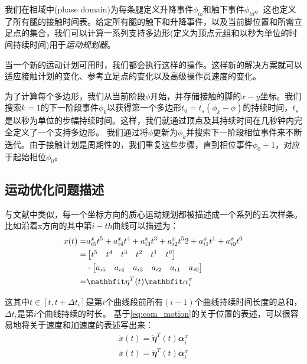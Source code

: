 我们在相域中(phase domain)为每条腿定义升降事件$\phi_{lo}$和触下事件$\phi_{td}$。这也定义了所有腿的接触时间表。给定所有腿的触下和升降事件，以及当前脚位置和所需立足点的集合，我们可以计算一系列支持多边形(定义为顶点元组和以秒为单位的时间持续时间)用于\emph{运动规划器}。

当一个新的运动计划可用时，我们都会执行这样的操作。这样新的解决方案就可以适应接触计划的变化、参考立足点的变化以及高级操作员速度的变化。

为了计算每个多边形，我们从当前阶段$\phi$开始，并存储接触的脚的$x-y$坐标。我们搜索$k=1$的下一阶段事件$\phi_k$以获得第一个多边形$t_0=  t_s(\phi_k-\phi)$的持续时间，$t_s$是以秒为单位的步幅持续时间。这样，我们就通过顶点及其持续时间在几秒钟内完全定义了一个支持多边形。
我们通过将$\phi$更新为$\phi_k$并搜索下一阶段相位事件来不断迭代。由于接触计划是周期性的，我们重复这些步骤，直到相位事件$\phi_0+1$，对应于起始相位$\phi_0$。

\subsection[质心运动优化问题描述]{\label{section:motion_opt_problem}运动优化问题描述\cite[p3]{Bellicoso_Jenelten_Gehring_Hutter_2018}}
与文献中类似，每一个坐标方向的质心运动规划都被描述成一个系列的五次样条。比如沿着x方向的其中第$i-th$曲线可以描述为：
\begin{align}
    \label{eq:com_motion}
    x(t) = & a_{i5}^x t^5 +  a_{i4}^x t^4 + a_{i3}^x t^3 +  a_{i2}^x t^52+  a_{i1}^x t^1 +  a_{i0}^x t^0 \notag\\
    = & \begin{bmatrix}t^5 & t^4 & t^3 & t^2 & t^1 & t^0\end{bmatrix} \notag\\ 
    & \cdot \begin{bmatrix}a_{i5} & a_{i4} & a_{i3} & a_{i2} & a_{i1} & a_{i0}\end{bmatrix} \notag\\
    = & {\mathbfit \eta}^T(t){\mathbfit \alpha}_i^x
\end{align}

 
这其中$t\in [t, t+\Delta t_i]$是第$i$个曲线段前所有$(i-1)$个曲线持续时间长度的总和，$\Delta t_i$是第$i$个曲线持续的时长。
基于\eqref{eq:com_motion}的关于位置的表述，可以很容易地将关于速度和加速度的表述写出来：
\begin{align}
\dot x(t) = \dot {\mathbfit \eta}^T(t){\mathbfit \alpha}_i^x \\
\ddot x(t) = \ddot {\mathbfit \eta}^T(t) {\mathbfit \alpha}_i^x 
\end{align}

